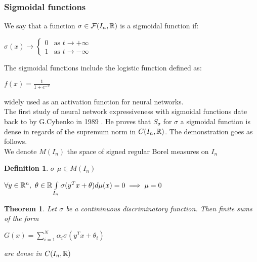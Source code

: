 \documentclass[12pt, a4paper]{article}
\newtheorem{theorem}{Theorem}
\newtheorem{definition}{Definition}
\begin{document}
\subsubsection{Sigmoidal functions}

We say that a function $\sigma \in \mathcal{F}(I_n, \mathbb{R})$ is a sigmoidal function if:\\

\begin{center}
  $\sigma(x) \to
  \begin{cases}
    0 &\text{as $t \to +\infty$}\\
    1 &\text{as $t \to -\infty$}
  \end{cases}$
\end{center}

The sigmoidal functions include the logistic function defined as:\\

\begin{center}
  $f(x) = \frac{1}{1+e^{-x}}$
\end{center}

widely used as an activation function for neural networks.\\

The first study of neural network expressiveness with sigmoidal functions date back to by G.Cybenko in 1989 \cite{cybenko_approximation_1989}. He proves that $S_\sigma$ for $\sigma$ a sigmoidal function is dense in regards of the supremum norm in $C(I_n, \mathbb{R})$. The demonstration goes as follows.\\

We denote $M(I_n)$ the space of signed regular Borel measures on $I_n$\\

\begin{definition}
  $\sigma$  $\mu \in M(I_n)$ \\ 
  \begin{center}
  $\forall y \in \mathbb{R}^n,$ $\theta \in \mathbb{R} \int\limits_{I_n} \sigma(y^Tx + \theta) d\mu(x) = 0 \implies \mu = 0$
\end{center}
\end{definition}

\begin{theorem}
  Let $\sigma$ be a contininuous discriminatory function. Then finite sums of the form\\\begin{center}
    $G(x) = \sum\limits_{i=1}^N \alpha_i \sigma(y^Tx + \theta_i)$
  \end{center}
  are dense in $C(I_n, \mathbb{R})$
\end{theorem}
\end{document}
